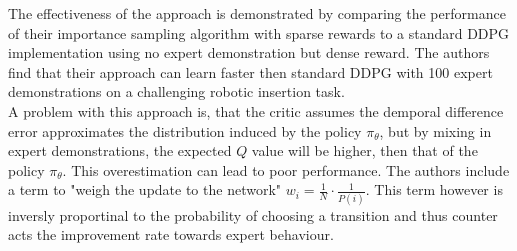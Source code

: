 The effectiveness of the approach is demonstrated by comparing the performance of their importance sampling algorithm with sparse rewards to a standard DDPG 
implementation using no expert demonstration but dense reward. The authors find that their approach can learn faster then standard DDPG with 100 expert 
demonstrations on a challenging robotic insertion task.\\ 
A problem with this approach is, that the critic assumes the demporal difference error approximates the distribution induced by the policy $\pi_{\theta}$, but by 
mixing in expert demonstrations, the expected $Q$ value will be higher, then that of the policy $\pi_{\theta}$. This overestimation can lead to poor performance. 
The authors include a term to "weigh the update to the network" $w_i = \frac{1}{N} \cdot \frac{1}{P(i)}$. This term however is inversly proportinal to the 
probability of choosing a transition and thus counter acts the improvement rate towards expert behaviour.

